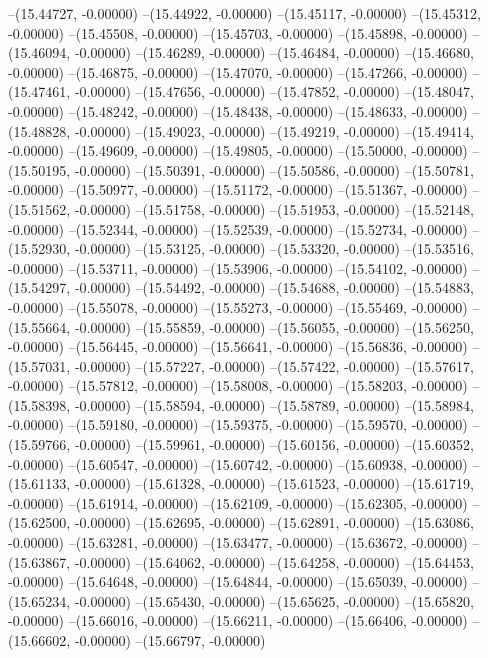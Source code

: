 --(15.44727, -0.00000)
--(15.44922, -0.00000)
--(15.45117, -0.00000)
--(15.45312, -0.00000)
--(15.45508, -0.00000)
--(15.45703, -0.00000)
--(15.45898, -0.00000)
--(15.46094, -0.00000)
--(15.46289, -0.00000)
--(15.46484, -0.00000)
--(15.46680, -0.00000)
--(15.46875, -0.00000)
--(15.47070, -0.00000)
--(15.47266, -0.00000)
--(15.47461, -0.00000)
--(15.47656, -0.00000)
--(15.47852, -0.00000)
--(15.48047, -0.00000)
--(15.48242, -0.00000)
--(15.48438, -0.00000)
--(15.48633, -0.00000)
--(15.48828, -0.00000)
--(15.49023, -0.00000)
--(15.49219, -0.00000)
--(15.49414, -0.00000)
--(15.49609, -0.00000)
--(15.49805, -0.00000)
--(15.50000, -0.00000)
--(15.50195, -0.00000)
--(15.50391, -0.00000)
--(15.50586, -0.00000)
--(15.50781, -0.00000)
--(15.50977, -0.00000)
--(15.51172, -0.00000)
--(15.51367, -0.00000)
--(15.51562, -0.00000)
--(15.51758, -0.00000)
--(15.51953, -0.00000)
--(15.52148, -0.00000)
--(15.52344, -0.00000)
--(15.52539, -0.00000)
--(15.52734, -0.00000)
--(15.52930, -0.00000)
--(15.53125, -0.00000)
--(15.53320, -0.00000)
--(15.53516, -0.00000)
--(15.53711, -0.00000)
--(15.53906, -0.00000)
--(15.54102, -0.00000)
--(15.54297, -0.00000)
--(15.54492, -0.00000)
--(15.54688, -0.00000)
--(15.54883, -0.00000)
--(15.55078, -0.00000)
--(15.55273, -0.00000)
--(15.55469, -0.00000)
--(15.55664, -0.00000)
--(15.55859, -0.00000)
--(15.56055, -0.00000)
--(15.56250, -0.00000)
--(15.56445, -0.00000)
--(15.56641, -0.00000)
--(15.56836, -0.00000)
--(15.57031, -0.00000)
--(15.57227, -0.00000)
--(15.57422, -0.00000)
--(15.57617, -0.00000)
--(15.57812, -0.00000)
--(15.58008, -0.00000)
--(15.58203, -0.00000)
--(15.58398, -0.00000)
--(15.58594, -0.00000)
--(15.58789, -0.00000)
--(15.58984, -0.00000)
--(15.59180, -0.00000)
--(15.59375, -0.00000)
--(15.59570, -0.00000)
--(15.59766, -0.00000)
--(15.59961, -0.00000)
--(15.60156, -0.00000)
--(15.60352, -0.00000)
--(15.60547, -0.00000)
--(15.60742, -0.00000)
--(15.60938, -0.00000)
--(15.61133, -0.00000)
--(15.61328, -0.00000)
--(15.61523, -0.00000)
--(15.61719, -0.00000)
--(15.61914, -0.00000)
--(15.62109, -0.00000)
--(15.62305, -0.00000)
--(15.62500, -0.00000)
--(15.62695, -0.00000)
--(15.62891, -0.00000)
--(15.63086, -0.00000)
--(15.63281, -0.00000)
--(15.63477, -0.00000)
--(15.63672, -0.00000)
--(15.63867, -0.00000)
--(15.64062, -0.00000)
--(15.64258, -0.00000)
--(15.64453, -0.00000)
--(15.64648, -0.00000)
--(15.64844, -0.00000)
--(15.65039, -0.00000)
--(15.65234, -0.00000)
--(15.65430, -0.00000)
--(15.65625, -0.00000)
--(15.65820, -0.00000)
--(15.66016, -0.00000)
--(15.66211, -0.00000)
--(15.66406, -0.00000)
--(15.66602, -0.00000)
--(15.66797, -0.00000)
